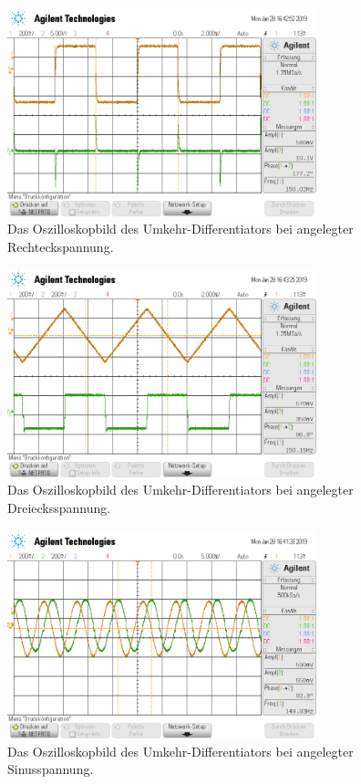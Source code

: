 \begin{figure}
  \centering
  \includegraphics[width=0.8\textwidth]{Schlager/scope_20.png}
  \caption{Das Oszilloskopbild des Umkehr-Differentiators bei angelegter Rechteckspannung.}
  \label{fig:diff_recht}
\end{figure}
\begin{figure}
  \centering
  \includegraphics[width=0.8\textwidth]{Schlager/scope_21.png}
  \caption{Das Oszilloskopbild des Umkehr-Differentiators bei angelegter Dreiecksspannung.}
  \label{fig:diff_drei}
\end{figure}
\begin{figure}
  \centering
  \includegraphics[width=0.8\textwidth]{Schlager/scope_19.png}
  \caption{Das Oszilloskopbild des Umkehr-Differentiators bei angelegter Sinusspannung.}
  \label{fig:diff_sin}
\end{figure}

